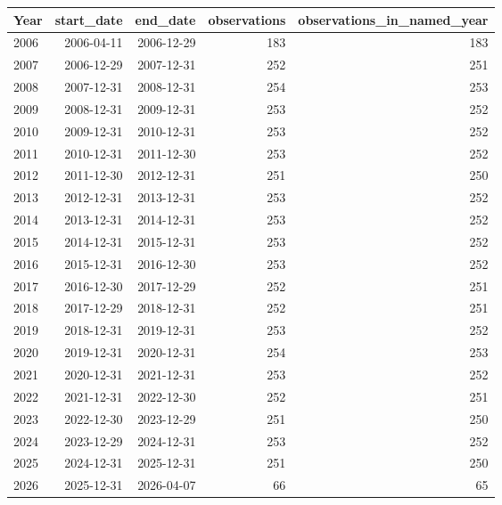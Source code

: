 \begin{tabular}{lrrrr}
\toprule
Year & start\_date & end\_date & observations & observations\_in\_named\_year \\
\midrule
2006 & 2006-04-11 & 2006-12-29 & 183 & 183 \\
2007 & 2006-12-29 & 2007-12-31 & 252 & 251 \\
2008 & 2007-12-31 & 2008-12-31 & 254 & 253 \\
2009 & 2008-12-31 & 2009-12-31 & 253 & 252 \\
2010 & 2009-12-31 & 2010-12-31 & 253 & 252 \\
2011 & 2010-12-31 & 2011-12-30 & 253 & 252 \\
2012 & 2011-12-30 & 2012-12-31 & 251 & 250 \\
2013 & 2012-12-31 & 2013-12-31 & 253 & 252 \\
2014 & 2013-12-31 & 2014-12-31 & 253 & 252 \\
2015 & 2014-12-31 & 2015-12-31 & 253 & 252 \\
2016 & 2015-12-31 & 2016-12-30 & 253 & 252 \\
2017 & 2016-12-30 & 2017-12-29 & 252 & 251 \\
2018 & 2017-12-29 & 2018-12-31 & 252 & 251 \\
2019 & 2018-12-31 & 2019-12-31 & 253 & 252 \\
2020 & 2019-12-31 & 2020-12-31 & 254 & 253 \\
2021 & 2020-12-31 & 2021-12-31 & 253 & 252 \\
2022 & 2021-12-31 & 2022-12-30 & 252 & 251 \\
2023 & 2022-12-30 & 2023-12-29 & 251 & 250 \\
2024 & 2023-12-29 & 2024-12-31 & 253 & 252 \\
2025 & 2024-12-31 & 2025-12-31 & 251 & 250 \\
2026 & 2025-12-31 & 2026-04-07 &  66 &  65 \\
\bottomrule
\end{tabular}
